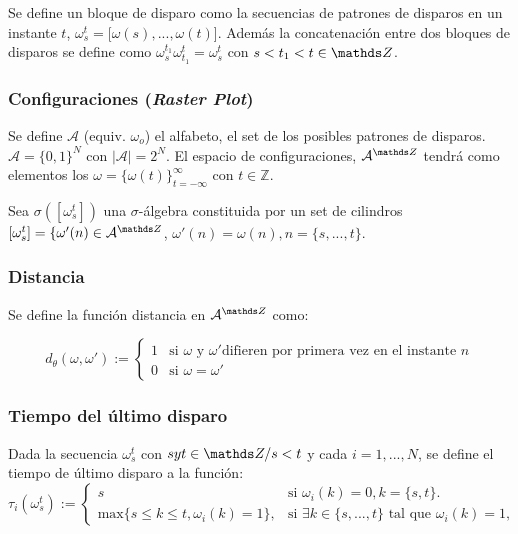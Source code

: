 Se define un bloque de disparo como la secuencias de patrones de disparos en un instante $t$, $\omega_s^t=[\omega(s),...,\omega(t)$]. Además la concatenación entre dos bloques de disparos se define como $\omega_s^{t_1}\omega_{t_1}^t=\omega_s^t$ con $s<t_1<t \in \enteros$.

\subsubsection{Configuraciones (\emph{Raster Plot})}

Se define $\mathcal{A}$ (equiv. $\omega_o$) el alfabeto, el set de los posibles patrones de disparos. $\mathcal{A}=\{0,1\}^N$ con $|\mathcal{A}|=2^N$. El espacio de configuraciones, $\mathcal{A}^{\enteros}$ tendrá como elementos los $\omega=\{\omega(t)\}^\infty_{t=-\infty}$ con $t \in \mathbb{Z}$. 

Sea $\sigma([\omega_s^t])$ una $\sigma$-álgebra constituida por un set de cilindros $[\omega_s^t]=\{ \omega'(n) \in \mathcal{A}^{\enteros}$, $\omega'(n)=\omega(n), n=\{s,...,t\} $.   


\subsubsection{Distancia}
Se define la función distancia en $\mathcal{A}^{\enteros}$ como:

\begin{equation}
    d_{\theta}(\omega,\omega') := \left\{ \begin{array}{ll}
        1 & \text{si } \omega \text{ y } \omega' \text{difieren por primera vez en el instante } n\\
        0  & \text{si } \omega=\omega'
    \end{array}\right.
    \label{eqn:distancia}
\end{equation}

\subsubsection{Tiempo del último disparo}
Dada la secuencia $\omega_s^t$ con $s y t \in \enteros / s<t$ y cada $i=1,...,N$, se define el tiempo de último disparo a la función:
\begin{equation}
    \tau_i(\omega_s^t) := \left\{ \begin{array}{ll}
        s   & \text{si } \omega_i(k)=0, k=\{s,t\}. \\ 
        \text{max}\{s \leq k \leq t, \omega_i(k)=1\}, & \text{si } \exists k \in \{s,...,t\} \text{ tal que }\omega_i(k)=1,
    \end{array}\right.
    \label{eqn:ultimoDisparo}
\end{equation}

